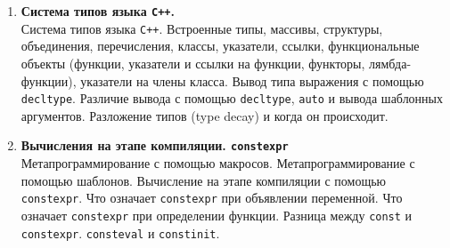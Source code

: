 \documentclass{article}
\begin{document}
\begin{enumerate}
\item \textbf{Система типов языка \texttt{C++}.}\\
Система типов языка \texttt{C++}. Встроенные типы, массивы, структуры, объединения, перечисления, классы, указатели, ссылки, функциональные объекты (функции, указатели и ссылки на функции, функторы, лямбда-функции), указатели на члены класса. Вывод типа выражения с помощью \texttt{decltype}. Различие вывода с помощью \texttt{decltype}, \texttt{auto} и вывода шаблонных аргументов. Разложение типов (type decay) и когда он происходит.

\item \textbf{Вычисления на этапе компиляции. \texttt{constexpr}} \\
Метапрограммирование с помощью макросов. Метапрограммирование с помощью шаблонов. Вычисление на этапе компиляции с помощью \texttt{constexpr}. Что означает \texttt{constexpr} при объявлении переменной. Что означает \texttt{constexpr} при определении функции. Разница между \texttt{const} и \texttt{constexpr}. \texttt{consteval} и \texttt{constinit}.


\end{enumerate}
\end{document}
